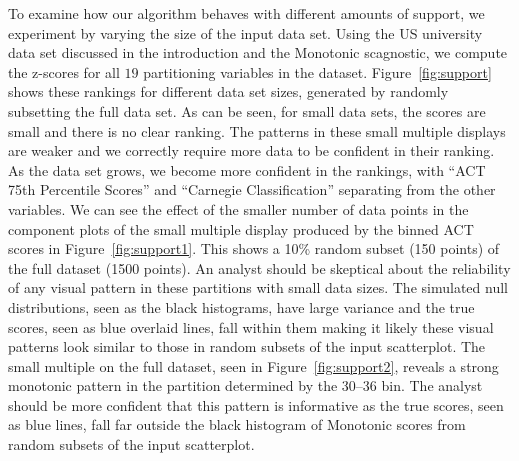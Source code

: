 To examine how our algorithm behaves with different amounts of support, we experiment by varying the size of the input data set. Using the US university data set discussed in the introduction and the Monotonic scagnostic, we compute the z-scores for all $19$ partitioning variables in the dataset. Figure~\ref{fig:support} shows these rankings for different data set sizes, generated by randomly subsetting the full data set.
As can be seen, for small data sets, the scores are small and there is no clear ranking. The patterns in these small multiple displays are weaker and we correctly require more data to be confident in their ranking. As the data set grows, we become more confident in the rankings, with ``ACT 75th Percentile Scores'' and ``Carnegie Classification'' separating from the other variables. 
We can see the effect of the smaller number of data points in the component plots of the small multiple display produced by the binned ACT scores in Figure~\ref{fig:support1}. This shows a 10\% random subset (150 points) of the full dataset (1500 points). An analyst should be skeptical about the reliability of any visual pattern in these partitions with small data sizes. The simulated null distributions, seen as the black histograms, have large variance and the true scores, seen as blue overlaid lines, fall within them making it likely these visual patterns look similar to those in random subsets of the input scatterplot.
The small multiple on the full dataset, seen in Figure~\ref{fig:support2}, reveals a strong monotonic pattern in the partition determined by the 30--36 bin. The analyst should be more confident that this pattern is informative as the true scores, seen as blue lines, fall far outside the black histogram of Monotonic scores from random subsets of the input scatterplot.

